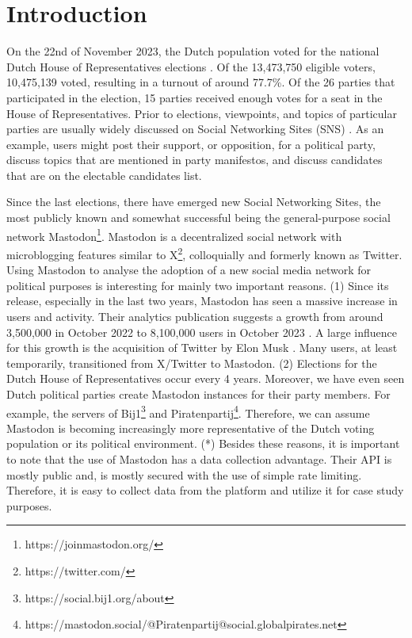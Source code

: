 \section{Introduction}
On the 22nd of November 2023, the Dutch population voted for the national Dutch House of Representatives elections \cite{kies}.
Of the 13,473,750 eligible voters, 10,475,139 voted, resulting in a turnout of around 77.7\%.
Of the 26 parties that participated in the election, 15 parties received enough votes for a seat in the House of Representatives.
Prior to elections, viewpoints, and topics of particular parties are usually widely discussed on Social Networking Sites (SNS) \cite{functions}.
As an example, users might post their support, or opposition, for a political party, discuss topics that are mentioned in party manifestos, and discuss candidates that are on the electable candidates list.

Since the last elections, there have emerged new Social Networking Sites, the most publicly known and somewhat successful being the general-purpose social network \cite{characteristics} Mastodon\footnote{https://joinmastodon.org/}. Mastodon is a decentralized social network with microblogging features similar to X\footnote{https://twitter.com/}, colloquially and formerly known as Twitter.
Using Mastodon to analyse the adoption of a new social media network for political purposes is interesting for mainly two important reasons. 
(1) Since its release, especially in the last two years, Mastodon has seen a massive increase in users and activity.
Their analytics publication suggests a growth from around 3,500,000 in October 2022 to 8,100,000 users in October 2023 \cite{analytics}.
A large influence for this growth is the acquisition of Twitter by Elon Musk \cite{musk}.
Many users, at least temporarily, transitioned from X/Twitter to Mastodon.
(2) Elections for the Dutch House of Representatives occur every 4 years.
Moreover, we have even seen Dutch political parties create Mastodon instances for their party members.
For example, the servers of Bij1\footnote{https://social.bij1.org/about} and Piratenpartij\footnote{https://mastodon.social/@Piratenpartij@social.globalpirates.net}.
Therefore, we can assume Mastodon is becoming increasingly more representative of the Dutch voting population or its political environment.
(*) Besides these reasons, it is important to note that the use of Mastodon has a data collection advantage.
Their API is mostly public and, is mostly secured with the use of simple rate limiting.
Therefore, it is easy to collect data from the platform and utilize it for case study purposes.

